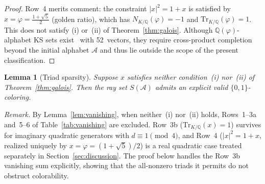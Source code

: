 \documentclass[12pt,a4paper]{article}
\newtheorem{lemma}{Lemma}
\newcommand{\Q}{\mathbb{Q}}
\newcommand{\Norm}[1]{N_{K/\Q}\!\left(#1\right)}
\newcommand{\Tr}[1]{\mathrm{Tr}_{K/\Q}\!\left(#1\right)}
\begin{document}
\begin{proof}
Row~4 merits comment: the constraint $|x|^2 = 1 + x$ is satisfied by
$x = \varphi = \tfrac{1+\sqrt{5}}{2}$ (golden ratio), which has
$\Norm{\varphi} = -1$ and $\Tr{\varphi} = 1$.  This does not satisfy
(i) or~(ii) of Theorem~\ref{thm:galois}.  Although
$\Q(\varphi)$-alphabet KS sets exist~\cite{Kernaghan2026islands} with
52~vectors, they require cross-product completion beyond the initial
alphabet $\mathcal{A}$ and thus lie outside the scope of the present
classification.
\end{proof}

\begin{lemma}[Triad sparsity]\label{lem:sparsity}
Suppose $x$ satisfies neither condition~\emph{(i)} nor~\emph{(ii)} of
Theorem~\ref{thm:galois}.  Then the ray set $S(\mathcal{A})$ admits an
explicit valid $\{0,1\}$-coloring.
\end{lemma}

\noindent\textit{Remark.}
By Lemma~\ref{lem:vanishing}, when neither~(i) nor~(ii) holds,
Rows~1--3a and~5--6 of Table~\ref{tab:vanishing} are excluded.
Row~3b ($\Tr{x} = 1$) survives for imaginary quadratic generators
with $d \equiv 1 \pmod{4}$, and Row~4 ($|x|^2 = 1 + x$, realized
uniquely by $x = \varphi = (1{+}\sqrt{5})/2$) is a real quadratic
case treated separately in Section~\ref{sec:discussion}.
The proof below handles the Row~3b vanishing sum explicitly, showing
that the all-nonzero triads it permits do not obstruct colorability.
\end{document}
